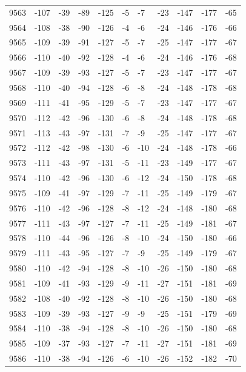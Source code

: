 \begin{table}[H]
\begin{tabular}{lllllllllll}
9563 & -107 & -39 & -89 & -125 & -5 & -7 & -23 & -147 & -177 & -65 \\
9564 & -108 & -38 & -90 & -126 & -4 & -6 & -24 & -146 & -176 & -66 \\
9565 & -109 & -39 & -91 & -127 & -5 & -7 & -25 & -147 & -177 & -67 \\
9566 & -110 & -40 & -92 & -128 & -4 & -6 & -24 & -146 & -176 & -68 \\
9567 & -109 & -39 & -93 & -127 & -5 & -7 & -23 & -147 & -177 & -67 \\
9568 & -110 & -40 & -94 & -128 & -6 & -8 & -24 & -148 & -178 & -68 \\
9569 & -111 & -41 & -95 & -129 & -5 & -7 & -23 & -147 & -177 & -67 \\
9570 & -112 & -42 & -96 & -130 & -6 & -8 & -24 & -148 & -178 & -68 \\
9571 & -113 & -43 & -97 & -131 & -7 & -9 & -25 & -147 & -177 & -67 \\
9572 & -112 & -42 & -98 & -130 & -6 & -10 & -24 & -148 & -178 & -66 \\
9573 & -111 & -43 & -97 & -131 & -5 & -11 & -23 & -149 & -177 & -67 \\
9574 & -110 & -42 & -96 & -130 & -6 & -12 & -24 & -150 & -178 & -68 \\
9575 & -109 & -41 & -97 & -129 & -7 & -11 & -25 & -149 & -179 & -67 \\
9576 & -110 & -42 & -96 & -128 & -8 & -12 & -24 & -148 & -180 & -68 \\
9577 & -111 & -43 & -97 & -127 & -7 & -11 & -25 & -149 & -181 & -67 \\
9578 & -110 & -44 & -96 & -126 & -8 & -10 & -24 & -150 & -180 & -66 \\
9579 & -111 & -43 & -95 & -127 & -7 & -9 & -25 & -149 & -179 & -67 \\
9580 & -110 & -42 & -94 & -128 & -8 & -10 & -26 & -150 & -180 & -68 \\
9581 & -109 & -41 & -93 & -129 & -9 & -11 & -27 & -151 & -181 & -69 \\
9582 & -108 & -40 & -92 & -128 & -8 & -10 & -26 & -150 & -180 & -68 \\
9583 & -109 & -39 & -93 & -127 & -9 & -9 & -25 & -151 & -179 & -69 \\
9584 & -110 & -38 & -94 & -128 & -8 & -10 & -26 & -150 & -180 & -68 \\
9585 & -109 & -37 & -93 & -127 & -7 & -11 & -27 & -151 & -181 & -69 \\
9586 & -110 & -38 & -94 & -126 & -6 & -10 & -26 & -152 & -182 & -70 \\

\end{tabular}
\end{table}

